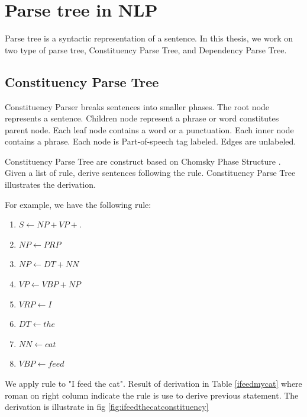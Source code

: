 

\section{Parse tree in NLP}
Parse tree is a syntactic representation of a sentence. In this thesis, we work on two type of parse tree, Constituency Parse Tree, and Dependency Parse Tree.
\subsection{Constituency Parse Tree}
Constituency Parser breaks sentences into smaller phases. The root node represents a sentence. Children node represent a phrase or word constitutes parent node. Each leaf node contains a word or a punctuation. Each inner node contains a phrase. Each node is Part-of-speech tag labeled. Edges are unlabeled.

Constituency Parse Tree are construct based on Chomsky Phase Structure \cite{chomsky2002syntactic}. Given a list of rule, derive sentences following the rule. Constituency Parse Tree illustrates the derivation.


For example, we have the following rule:
\begin{enumerate}[label=(\roman*)]
    \item $S \leftarrow NP + VP + .$
    \item $NP \leftarrow PRP $
    \item $NP \leftarrow DT + NN$
    \item $VP \leftarrow VBP + NP$
    \item $VRP \leftarrow I$
    \item $DT \leftarrow the$
    \item $NN \leftarrow cat$
    \item $VBP \leftarrow feed$
\end{enumerate}
We apply rule to "I feed the cat". Result of derivation in Table \ref{ifeedmycat}  where roman on right column indicate the rule is use to derive previous statement. The derivation is illustrate in fig \ref{fig:ifeedthecatconstituency}

